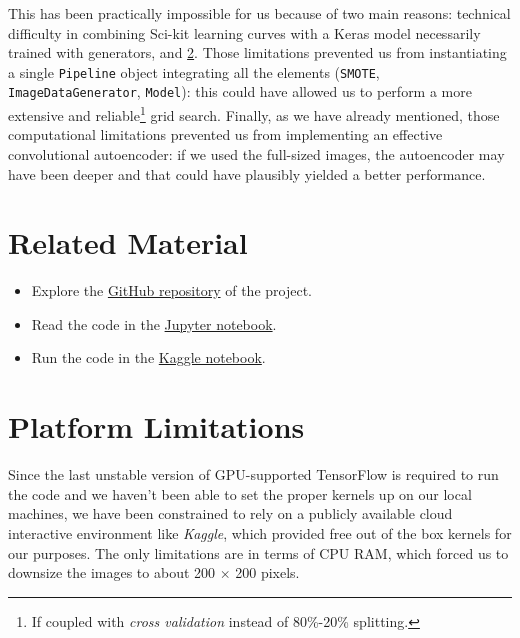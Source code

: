 \documentclass[aps,twocolumn,secnumarabic,nobalancelastpage,amsmath,amssymb,
nofootinbib]{revtex4}
\begin{document}
This has been practically impossible for us because of two main reasons: technical difficulty in combining Sci-kit learning curves with a Keras model necessarily trained with generators, and \ref{platform-limitations}. Those limitations prevented us from instantiating a single \texttt{Pipeline} object integrating all the elements (\texttt{SMOTE}, \texttt{ImageDataGenerator}, \texttt{Model}): this could have allowed us to perform a more extensive and reliable\footnote{If coupled with \emph{cross validation} instead of 80\%-20\% splitting.} grid search. Finally, as we have already mentioned, those computational limitations prevented us from implementing an effective convolutional autoencoder: if we used the full-sized images, the autoencoder may have been deeper and that could have plausibly yielded a better performance.


\appendix


\section{Related Material}\label{additional-material}

\begin{itemize}

\item
Explore the
\href{https://github.com/InPhyT/NeuralNetworksProject}{GitHub
	repository} of the project.
\vspace{-0.2cm}\item
Read the code in the
\href{https://nbviewer.jupyter.org/github/InPhyT/NeuralNetworksProject/Notebooks/notebook.ipynb}{Jupyter
	notebook}.
\vspace{-0.2cm}\item
Run the code in the
\href{https://www.kaggle.com/inphyt2020/neuralnetworksproject}{Kaggle
	notebook}.
\end{itemize}

\section{Platform Limitations}\label{platform-limitations}

Since the last unstable version of GPU-supported TensorFlow is required
to run the code and we haven't been able to set the proper kernels up on
our local machines, we have been constrained to rely on a publicly
available cloud interactive environment like \emph{Kaggle}, which
provided free out of the box kernels for our purposes. The only
limitations are in terms of CPU RAM, which forced us to downsize the
images to about 200 \(\times\) 200 pixels.
\end{document}
